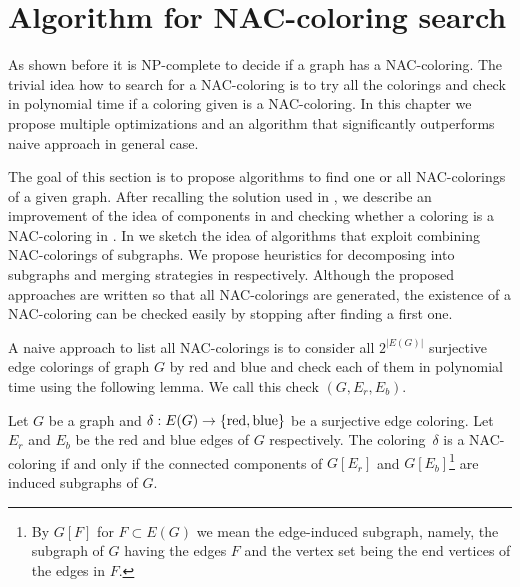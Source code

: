 \chapter{Algorithm for NAC-coloring search}%
\label{chapter:alg}

\begin{chapterabstract}

	As shown before it is NP-complete to decide if a graph has a NAC-coloring.
	The trivial idea how to search for a NAC-coloring is to try all the colorings
	and check in polynomial time if a coloring given is a NAC-coloring.
	In this chapter we propose multiple optimizations
	and an algorithm that significantly outperforms naive approach in general case.

\end{chapterabstract}

The goal of this section is to propose algorithms to find one or all NAC-colorings of a given graph.
After recalling the solution used in \flexrilog{},
we describe an improvement of the idea of \trcon{} components in 
and checking whether a coloring is a NAC-coloring in .
In  we sketch the idea of algorithms that
exploit combining NAC-colorings of subgraphs.
We propose heuristics for decomposing into subgraphs and merging strategies
in  respectively.
Although the proposed approaches are written so that all NAC-colorings are generated,
the existence of a NAC-coloring can be checked easily by stopping after finding a first one.

A naive approach to list all NAC-colorings is to consider
all $2^{|E(G)|}$ surjective edge colorings of graph $G$ by red and blue
and check each of them in polynomial time using the following lemma.
We call this check \IsNACColoring{}$(G, E_r, E_b)$.

\begin{lemma}
	\label{lemma:is_NAC_coloring}
	Let $G$ be a graph and $\delta: E(G) \to \{\text{red}, \text{blue}\}$ be a surjective edge coloring.
	Let $E_r$ and $E_b$ be the red and blue edges of $G$ respectively.
	The coloring~$\delta $ is a NAC-coloring if and only if
	the connected components of $G[E_r]$ and $G[E_b]$\footnote{
		By $G[F]$ for $F\subset E(G)$ we mean the edge-induced subgraph,
		namely, the subgraph of $G$ having the edges $F$ and the vertex set
		being the end vertices of the edges in $F$.}
	are induced subgraphs of $G$.
\end{lemma}

